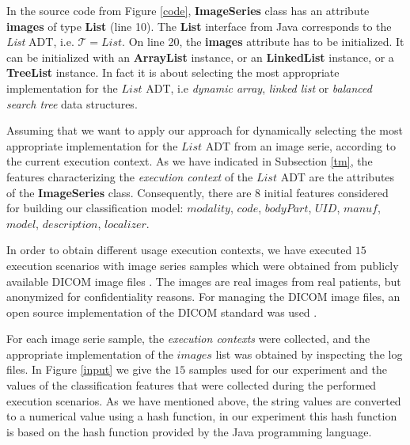 In the source code from Figure \ref{code}, \textbf{ImageSeries} class has an attribute \textbf{images} of type \textbf{List} (line 10). The \textbf{List} interface from Java corresponds to the \emph{List} ADT, i.e. $\mathcal{T}=List$. On line 20, the \textbf{images} attribute has to be initialized. It can be initialized with an \textbf{ArrayList} instance, or an \textbf{LinkedList} instance, or a \textbf{TreeList} instance. In fact it is about selecting the most appropriate implementation for the $List$ ADT, i.e  \emph{dynamic array}, \emph{linked list} or \emph{balanced search tree} data structures.

Assuming that we want to apply our approach for dynamically selecting the most appropriate  implementation for the $List$ ADT from an image serie, according to the current execution context. As we have indicated in Subsection \ref{tm}, the features characterizing the \emph{execution context} of the $List$ ADT are the attributes of the \textbf{ImageSeries} class. Consequently, there are $8$ initial features considered for building our classification model: $modality$, $code$, $bodyPart$, $UID$, $manuf$, $model$, $description$, $localizer$.

In order to obtain different usage execution contexts, we have executed $15$ execution scenarios with image series samples which were obtained from publicly available DICOM image files  \cite{im1} \cite{im2} \cite{im3} \cite{im4} \cite{im5}. The images are real images from real patients, but anonymized for confidentiality reasons. For managing the DICOM image files, an open source implementation of the DICOM standard was used \cite{im6}.

For each image serie sample, the \emph{execution contexts} were collected, and the appropriate implementation of the $images$ list was obtained by inspecting the log files.  In Figure \ref{input} we give the $15$ samples used for our experiment and the values of the classification features that were collected during the performed execution scenarios. As we have mentioned above, the string values are converted to a numerical value using a hash function, in our experiment this hash function is based on the hash function  provided by the Java programming language.

